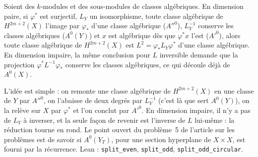 \begin{enonce}
Soient des $k$-modules et des sous-modules de classes algébriques. En dimension paire, si $\varphi^*$ est surjectif, $L_Y$ un isomorphisme, toute classe algébrique de $H^{2m+2}(X)$ l'image par $\varphi_*$ d'une classe algébrique ($A''^0$), $L_Y^{-1}$ conserve les classes algébriques ($A^0(Y)$) et $x$ est algébrique dès que $\varphi^*x$ l'est ($A'^0$), alors toute classe algébrique de $H^{2m+2}(X)$ est $L^2 = \varphi_* L_Y \varphi^*$ d'une classe algébrique. En dimension impaire, la même conclusion pour $L$ inversible demande que la projection $\varphi^* L^{-1} \varphi_*$ conserve les classes algébriques, ce qui découle déjà de $A^0(X)$.
\end{enonce}
{\small L'idée est simple : on remonte une classe algébrique de $H^{2m+2}(X)$ en une classe de $Y$ par $A''^0$, on l'abaisse de deux degrés par $L_Y^{-1}$ (c'est là que sert $A^0(Y)$), on la relève sur $X$ par $\varphi^*$ et l'on conclut par $A'^0$. En dimension impaire, il n'y a pas de $L_Y$ à inverser, et la seule façon de revenir est l'inverse de $L$ lui-même : la réduction tourne en rond. Le point ouvert du problème~5 de l'article sur les problèmes est de savoir si $A^0(Y_T)$, pour une section hyperplane de $X \times X$, est fourni par la récurrence. Lean : \texttt{split\_even}, \texttt{split\_odd}, \texttt{split\_odd\_circular}.\par}
